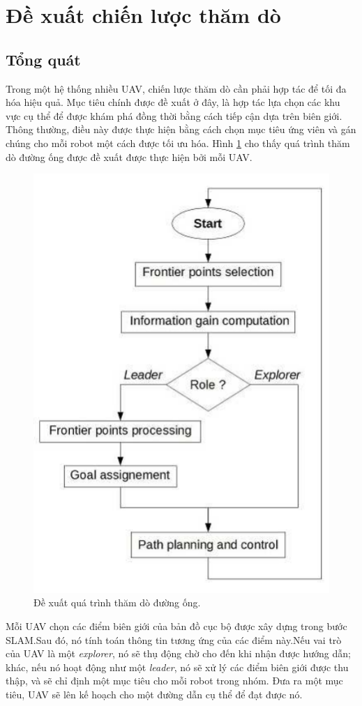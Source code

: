 \documentclass[11pt,openany]{book}
\begin{document}
\section{Đề xuất chiến lược thăm dò}
\subsection{Tổng quát}
Trong một hệ thống nhiều UAV, chiến lược thăm dò cần phải hợp tác để tối đa hóa hiệu quả. Mục tiêu chính được đề xuất ở đây, là hợp tác lựa chọn các khu vực cụ thể để được khám phá đồng thời bằng cách tiếp cận dựa trên biên giới. Thông thường, điều này được thực hiện bằng cách chọn mục tiêu ứng viên và gán chúng cho mỗi robot một cách được tối ưu hóa. Hình \ref{fig:3.1} cho thấy quá trình thăm dò đường ống được đề xuất được thực hiện bởi mỗi UAV.
\begin{figure}[H]
    \centering
    \includegraphics[scale=0.6]{assets/3_1.png}
    \caption{Đề xuất quá trình thăm dò đường ống.}
    \label{fig:3.1}
\end{figure}
Mỗi UAV chọn các điểm biên giới của bản đồ cục bộ được xây dựng trong bước SLAM.Sau đó, nó tính toán thông tin tương ứng của các điểm này.Nếu vai trò của UAV là một \textit{explorer}, nó sẽ thụ động chờ cho đến khi nhận được hướng dẫn; khác, nếu nó hoạt động như một \textit{leader}, nó sẽ xử lý các điểm biên giới được thu thập, và sẽ chỉ định một mục tiêu cho mỗi robot trong nhóm. Đưa ra một mục tiêu, UAV sẽ lên kế hoạch cho một đường dẫn cụ thể để đạt được nó.\\\\
\end{document}
